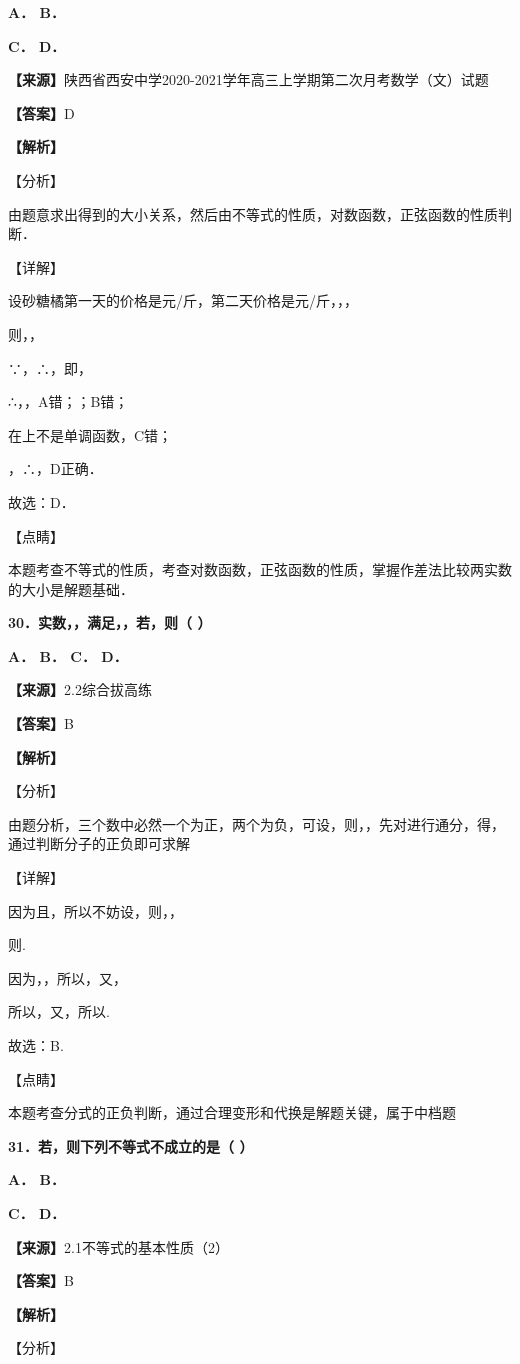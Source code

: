 \textbf{A． B．}

\textbf{C． D．}

\textbf{【来源】}陕西省西安中学2020-2021学年高三上学期第二次月考数学（文）试题

\textbf{【答案】}D

\textbf{【解析】}

【分析】

由题意求出得到的大小关系，然后由不等式的性质，对数函数，正弦函数的性质判断．

【详解】

设砂糖橘第一天的价格是元/斤，第二天价格是元/斤，，，

则，，

∵，∴，即，

∴，，A错；；B错；

在上不是单调函数，C错；

，∴，D正确．

故选：D．

【点睛】

本题考查不等式的性质，考查对数函数，正弦函数的性质，掌握作差法比较两实数的大小是解题基础．

\textbf{30．实数，，满足，，若，则（ ）}

\textbf{A． B． C． D．}

\textbf{【来源】}2.2综合拔高练

\textbf{【答案】}B

\textbf{【解析】}

【分析】

由题分析，三个数中必然一个为正，两个为负，可设，则，，先对进行通分，得，通过判断分子的正负即可求解

【详解】

因为且，所以不妨设，则，，

则.

因为，，所以，又，

所以，又，所以.

故选：B.

【点睛】

本题考查分式的正负判断，通过合理变形和代换是解题关键，属于中档题

\textbf{31．若，则下列不等式不成立的是（ ）}

\textbf{A． B．}

\textbf{C． D．}

\textbf{【来源】}2.1不等式的基本性质（2）

\textbf{【答案】}B

\textbf{【解析】}

【分析】

